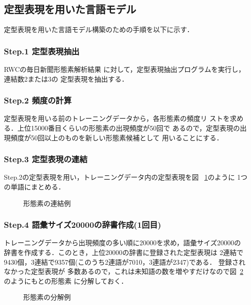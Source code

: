 \subsection{定型表現を用いた言語モデル}

定型表現を用いた言語モデル構築のための手順を以下に示す．

\subsubsection*{Step.1 定型表現抽出}
RWCの毎日新聞形態素解析結果
に対して，定型表現抽出プログラムを実行し，連結数2または3の
定型表現を抽出する．

\subsubsection*{Step.2 頻度の計算}
定型表現を用いる前のトレーニングデータから，各形態素の頻度リ
ストを求める．上位15000番目くらいの形態素の出現頻度が50回で
あるので，\mbox{定型表現の出現頻度が50回以上のものを新}しい形態素候補として
用いることにする．

\subsubsection*{Step.3 定型表現の連結}
Step.2の定型表現を用い，トレーニングデータ内の定型表現を図~
\ref{renketu}のように
\mbox{1つの単語にま}とめる．
\vspace*{-5mm}
\begin{figure}[htbp]
\centering
{}
\caption{形態素の連結例}
\label{renketu}
\end{figure}
\vspace*{3mm}

\subsubsection*{Step.4 語彙サイズ20000の辞書作成(1回目)}
トレーニングデータから出現頻度の多い順に20000を求め，語彙サイズ20000の
辞書を作成する．このとき，上位20000の辞書に登録された定型表現は
2連結で9430個，\mbox{3連結で9357個}(このうち2連語が7010，3連語が2347)である．
登録されなかった定型表現が
\mbox{多数あるので，こ}れは未知語の数を増やすだけなので図~\ref{bun}
のようにもとの形態素
に分解しておく．

\begin{figure}[htbp]
\centering
{}
\caption{形態素の分解例}
\label{bun}
\end{figure}

